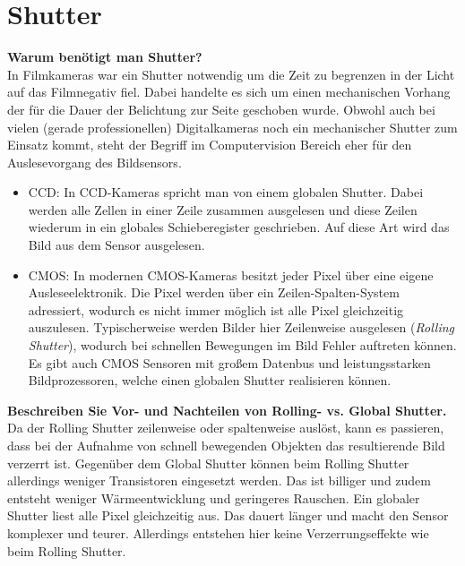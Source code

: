 \documentclass[a4paper]{article}
\begin{document}
	
	\section{Shutter}
	\textbf{Warum benötigt man Shutter?}\\
	In Filmkameras war ein Shutter notwendig um die Zeit zu begrenzen in der Licht auf das Filmnegativ fiel. Dabei handelte es sich um einen mechanischen Vorhang der für die Dauer der Belichtung zur Seite geschoben wurde. Obwohl auch bei vielen (gerade professionellen) Digitalkameras noch ein mechanischer Shutter zum Einsatz kommt, steht der Begriff im Computervision Bereich eher für den Auslesevorgang des Bildsensors.
	\begin{itemize}
		\item CCD: In CCD-Kameras spricht man von einem globalen Shutter. Dabei werden alle Zellen in einer Zeile zusammen ausgelesen und diese Zeilen wiederum in ein globales Schieberegister geschrieben. Auf diese Art wird das Bild aus dem Sensor ausgelesen.
		\item CMOS: In modernen CMOS-Kameras besitzt jeder Pixel über eine eigene Ausleseelektronik. Die Pixel werden über ein Zeilen-Spalten-System adressiert, wodurch es nicht immer möglich ist alle Pixel gleichzeitig auszulesen. Typischerweise werden Bilder hier Zeilenweise ausgelesen (\textit{Rolling Shutter}), wodurch bei schnellen Bewegungen im Bild Fehler auftreten können. Es gibt auch CMOS Sensoren mit großem Datenbus und leistungsstarken Bildprozessoren, welche einen globalen Shutter realisieren können.
	\end{itemize}
	\newpage
	\noindent
	\textbf{Beschreiben Sie Vor- und Nachteilen von Rolling- vs. Global Shutter.}\\
	Da der Rolling Shutter zeilenweise oder spaltenweise auslöst, kann es passieren, dass bei der Aufnahme von schnell bewegenden Objekten das resultierende Bild verzerrt ist. Gegenüber dem Global Shutter können beim Rolling Shutter allerdings weniger Transistoren eingesetzt werden. Das ist billiger und zudem entsteht weniger Wärmeentwicklung und geringeres Rauschen. Ein globaler Shutter liest alle Pixel gleichzeitig aus. Das dauert länger und macht den Sensor komplexer und teurer. Allerdings entstehen hier keine Verzerrungseffekte wie beim Rolling Shutter. 
\end{document}
